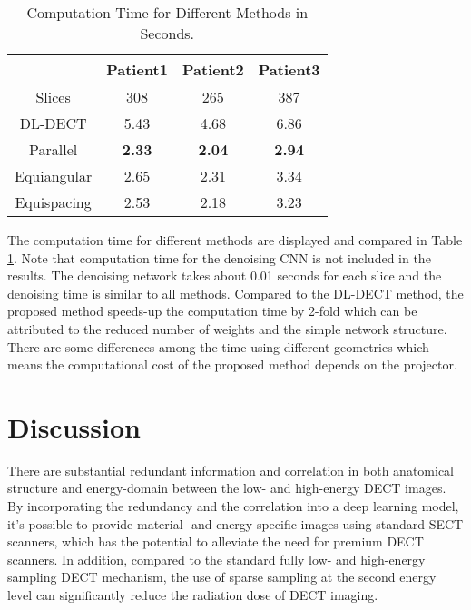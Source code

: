 \documentclass[journal,twoside,web]{ieeecolor}
\begin{document}
\begin{table}[t]%
    \begin{center}
        \caption{Computation Time for Different Methods in Seconds.}
        \begin{tabular}{ c c c c }
            \hline\hline
            & Patient1 & Patient2 & Patient3 \\
            \hline
            Slices & 308 & 265 & 387 \\
            \hline
            DL-DECT & 5.43 & 4.68 & 6.86 \\
            Parallel & \textbf{2.33} & \textbf{2.04} & \textbf{2.94} \\
            Equiangular & 2.65 & 2.31 & 3.34 \\
            Equispacing & 2.53 & 2.18 & 3.23 \\
            \hline\hline
        \end{tabular}
        \label{tab:5}
        \vspace{-5mm}
    \end{center}
\end{table}

The computation time for different methods are displayed and compared in Table \ref{tab:5}. Note that computation time for the denoising CNN is not included in the results. The denoising network takes about 0.01 seconds for each slice and the denoising time is similar to all methods. Compared to the DL-DECT method, the proposed method speeds-up the computation time by 2-fold which can be attributed to the reduced number of weights and the simple network structure. There are some differences among the time using different geometries which means the computational cost of the proposed method depends on the projector. %


\section{Discussion}
There are substantial redundant information and correlation in both anatomical structure and energy-domain between the low- and high-energy DECT images. By incorporating the redundancy and the correlation into a deep learning model, it’s possible to provide material- and energy-specific images using standard SECT scanners, which has the potential to alleviate the need for premium DECT scanners. In addition, compared to the standard fully low- and high-energy sampling DECT mechanism, the use of sparse sampling at the second energy level can significantly reduce the radiation dose of DECT imaging.
\end{document}
